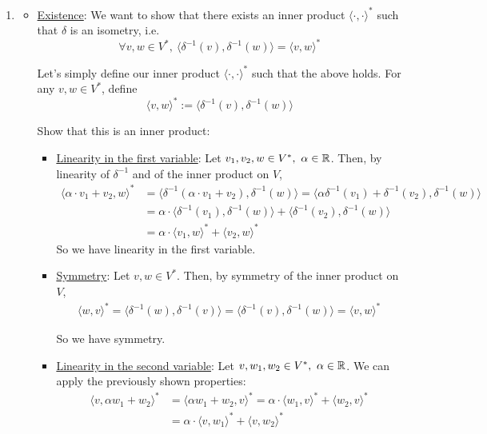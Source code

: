 \documentclass[12pt]{article}
\begin{document}
\begin{enumerate}[label=\alph*)]
    \item 
    \begin{itemize}
        \item \underline{Existence}: We want to show that there exists an inner product $\langle \cdot, \cdot \rangle^*$ such that $\delta$ is an isometry, i.e.
        $$
            \forall v, w \in V^*,\ \langle \delta^{-1}(v), \delta^{-1}(w) \rangle = \langle v, w \rangle^*
        $$

        Let's simply define our inner product $\langle \cdot, \cdot \rangle^*$ such that the above holds. For any $v, w \in V^*$, define
        $$
            \langle v, w \rangle^* := \langle \delta^{-1}(v), \delta^{-1}(w) \rangle
        $$

        Show that this is an inner product:
        \begin{itemize}
            \item \underline{Linearity in the first variable}: Let $v_1, v_2, w \in V^*,\ \alpha \in \mathbb{R}$. Then, by linearity of $\delta^{-1}$ and of the inner product on $V$,
            $$
            \begin{aligned}
                \langle \alpha \cdot v_1 + v_2, w \rangle^* &= \langle \delta^{-1}(\alpha \cdot v_1 + v_2), \delta^{-1}(w) \rangle = \langle \alpha \delta^{-1}(v_1) + \delta^{-1}(v_2), \delta^{-1}(w) \rangle \\
                &= \alpha \cdot \langle \delta^{-1}(v_1), \delta^{-1}(w) \rangle + \langle \delta^{-1}(v_2), \delta^{-1}(w) \rangle \\
                &= \alpha \cdot \langle v_1, w \rangle^* + \langle v_2, w \rangle^*
            \end{aligned}
            $$
            So we have linearity in the first variable.
            
            \item \underline{Symmetry}: Let $v, w \in V^*$. Then, by symmetry of the inner product on $V$,
            \[
            \begin{aligned}
                \langle w, v \rangle^* = \langle \delta^{-1}(w), \delta^{-1}(v) \rangle = \langle \delta^{-1}(v), \delta^{-1}(w) \rangle = \langle v, w \rangle^*
            \end{aligned}
            \]

            So we have symmetry.

            \item \underline{Linearity in the second variable}: Let $v, w_1, w_2 \in V^*,\ \alpha \in \mathbb{R}$. We can apply the previously shown properties:
            \[
            \begin{aligned}
                \langle v, \alpha w_1 + w_2 \rangle^* &= \langle \alpha w_1 + w_2, v \rangle^* = \alpha \cdot \langle w_1, v \rangle^* + \langle w_2, v \rangle^* \\
                &= \alpha \cdot \langle v, w_1 \rangle^* + \langle v, w_2 \rangle^*
            \end{aligned}
            \]


\end{itemize}
\end{itemize}
\end{enumerate}
\end{document}
